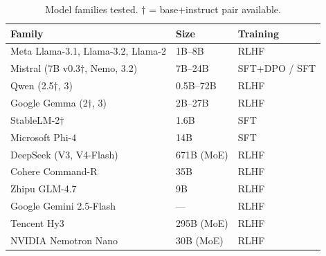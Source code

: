 \begin{table}[h]
\centering\small
\caption{Model families tested. $\dagger$ = base+instruct pair available.}
\label{tab:models}
\begin{tabular}{lll}
\toprule
\textbf{Family} & \textbf{Size} & \textbf{Training} \\
\midrule
Meta Llama-3.1, Llama-3.2, Llama-2 & 1B--8B & RLHF \\
Mistral (7B v0.3$\dagger$, Nemo, 3.2) & 7B--24B & SFT+DPO / SFT \\
Qwen (2.5$\dagger$, 3) & 0.5B--72B & RLHF \\
Google Gemma (2$\dagger$, 3) & 2B--27B & RLHF \\
StableLM-2$\dagger$ & 1.6B & SFT \\
Microsoft Phi-4 & 14B & SFT \\
DeepSeek (V3, V4-Flash) & 671B (MoE) & RLHF \\
Cohere Command-R & 35B & RLHF \\
Zhipu GLM-4.7 & 9B & RLHF \\
Google Gemini 2.5-Flash & --- & RLHF \\
Tencent Hy3 & 295B (MoE) & RLHF \\
NVIDIA Nemotron Nano & 30B (MoE) & RLHF \\
\bottomrule
\end{tabular}
\end{table}
